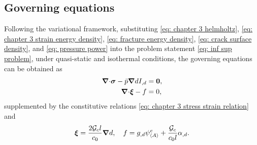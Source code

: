 \subsection{Governing equations}
\label{section: Chapter3/theory/governing}

Following the variational framework, substituting \eqref{eq: chapter 3 helmholtz}, \eqref{eq: chapter 3 strain energy density}, \eqref{eq: fracture energy density}, \eqref{eq: crack surface density}, and \eqref{eq: pressure power} into the problem statement \eqref{eq: inf sup problem}, under quasi-static and isothermal conditions, the governing equations can be obtained as
\begin{subequations}
  \begin{align}
    {\boldsymbol{\nabla}\cdot} \boldsymbol{\sigma} - \bar{p} \boldsymbol{\nabla} d I_{,d} & = \boldsymbol{0}, \\
    {\boldsymbol{\nabla} \cdot} \boldsymbol{\xi} - f                     & = 0,      
  \end{align}
\end{subequations}
supplemented by the constitutive relations \eqref{eq: chapter 3 stress strain relation} and
\begin{align}
  \boldsymbol{\xi} = \dfrac{2{\mathcal{G}_c} l}{c_0} \boldsymbol{\nabla} d, \quad f = g_{,d}\psi^e_{\left< A \right>} + \dfrac{{\mathcal{G}_c}}{c_0l}\alpha_{,d}.
\end{align}
